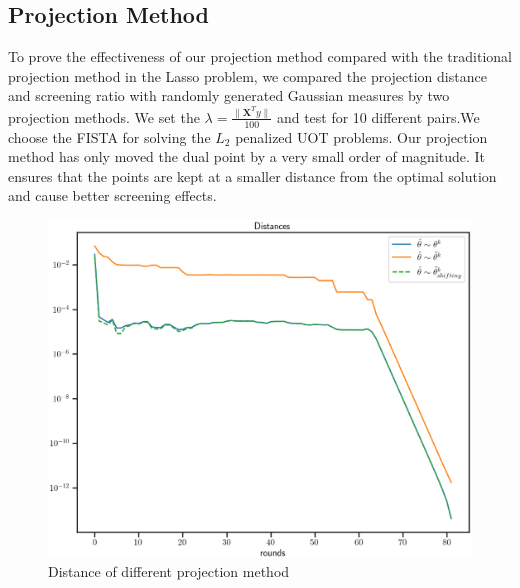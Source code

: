 \documentclass[twoside]{article}
\theoremstyle{plain}
\newcommand{\tranT}{T}
\begin{document}
\subsection{Projection Method}
To prove the effectiveness of our projection method compared with the traditional projection method in the Lasso problem, we compared the projection distance and screening ratio with randomly generated Gaussian measures by two projection methods. We set the $\lambda = \frac{\|\mathbf{X}^{\tranT}y\|}{100}$ and test for 10 different pairs.We choose the FISTA for solving the $L_2$ penalized UOT problems. Our projection method has only moved the dual point by a very small order of magnitude. It ensures that the points are kept at a smaller distance from the optimal solution and cause better screening effects.
	\begin{figure}[h]
	\begin{center}	
	\includegraphics[width = \linewidth]{pic/projdis}
	\caption{Distance of different projection method}
	\end{center}	
	\end{figure}
\end{document}
